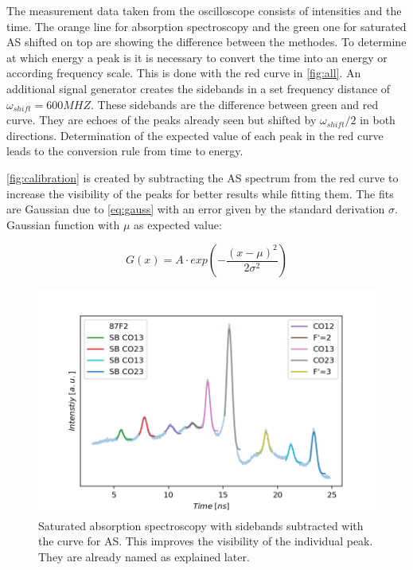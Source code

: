 \documentclass[]{article}
\begin{document}
The measurement data taken from the oscilloscope consists of intensities and the time. The orange line for absorption spectroscopy and the green one for saturated AS shifted on top are showing the difference between the methodes.
To determine at which energy a peak is it is necessary to convert the time into an energy or according frequency scale. This is done with the red curve in \autoref{fig:all}. An additional signal generator creates the sidebands in a set frequency distance of $\omega_{shift}=600MHZ$. These sidebands are the difference between green and red curve. They are echoes of the peaks already seen but shifted by $\omega_{shift}/2$ in both directions. Determination of the expected value of each peak in the red curve leads to the conversion rule from time to energy. 

\autoref{fig:calibration} is created by subtracting the AS spectrum from the red curve to increase the visibility of the peaks for better results while fitting them. The fits are Gaussian due to \autoref{eq:gauss} with an error given by the standard derivation $\sigma$. Gaussian function with $\mu$ as expected value:

\begin{equation}
G(x) = A \cdot exp\left( -\frac{(x-\mu)^2}{2\sigma^2} \right)
\end{equation}

\begin{figure}[H]
\centering
\includegraphics[width=.8\textwidth]{Plots/Calibration_Second_Real.png}
\caption{Saturated absorption spectroscopy with sidebands subtracted with the curve for AS. This improves the visibility of the individual peak. They are already named as explained later.}
\label{fig:calibration}
\end{figure}

\end{document}
